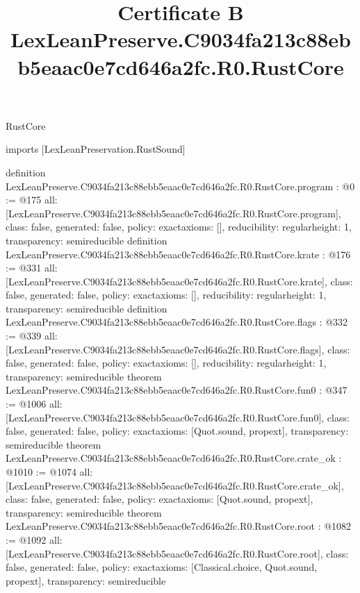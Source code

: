 \begin{lexlean}{RustCore}
\title{Certificate B LexLeanPreserve.C9034fa213c88ebb5eaac0e7cd646a2fc.R0.RustCore}
\begin{coremodule}
imports [LexLeanPreservation.RustSound]

definition LexLeanPreserve.C9034fa213c88ebb5eaac0e7cd646a2fc.R0.RustCore.program : @0 := @175 {
  all: [LexLeanPreserve.C9034fa213c88ebb5eaac0e7cd646a2fc.R0.RustCore.program],
  class: false,
  generated: false,
  policy: exact{axioms: []},
  reducibility: regular{height: 1},
  transparency: semireducible
}
definition LexLeanPreserve.C9034fa213c88ebb5eaac0e7cd646a2fc.R0.RustCore.krate : @176 := @331 {
  all: [LexLeanPreserve.C9034fa213c88ebb5eaac0e7cd646a2fc.R0.RustCore.krate],
  class: false,
  generated: false,
  policy: exact{axioms: []},
  reducibility: regular{height: 1},
  transparency: semireducible
}
definition LexLeanPreserve.C9034fa213c88ebb5eaac0e7cd646a2fc.R0.RustCore.flags : @332 := @339 {
  all: [LexLeanPreserve.C9034fa213c88ebb5eaac0e7cd646a2fc.R0.RustCore.flags],
  class: false,
  generated: false,
  policy: exact{axioms: []},
  reducibility: regular{height: 1},
  transparency: semireducible
}
theorem LexLeanPreserve.C9034fa213c88ebb5eaac0e7cd646a2fc.R0.RustCore.fun0 : @347 := @1006 {
  all: [LexLeanPreserve.C9034fa213c88ebb5eaac0e7cd646a2fc.R0.RustCore.fun0],
  class: false,
  generated: false,
  policy: exact{axioms: [Quot.sound, propext]},
  transparency: semireducible
}
theorem LexLeanPreserve.C9034fa213c88ebb5eaac0e7cd646a2fc.R0.RustCore.crate_ok : @1010 := @1074 {
  all: [LexLeanPreserve.C9034fa213c88ebb5eaac0e7cd646a2fc.R0.RustCore.crate_ok],
  class: false,
  generated: false,
  policy: exact{axioms: [Quot.sound, propext]},
  transparency: semireducible
}
theorem LexLeanPreserve.C9034fa213c88ebb5eaac0e7cd646a2fc.R0.RustCore.root : @1082 := @1092 {
  all: [LexLeanPreserve.C9034fa213c88ebb5eaac0e7cd646a2fc.R0.RustCore.root],
  class: false,
  generated: false,
  policy: exact{axioms: [Classical.choice, Quot.sound, propext]},
  transparency: semireducible
}


\end{coremodule}
\end{lexlean}
